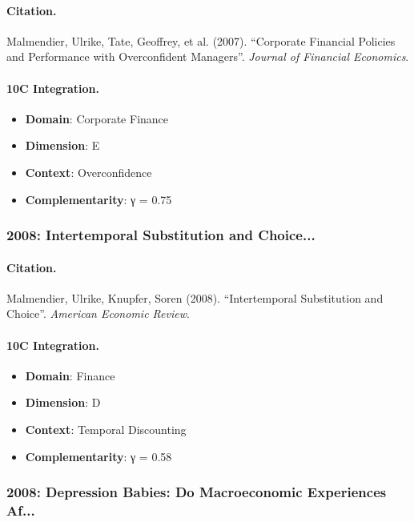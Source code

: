 \paragraph{Citation.}
Malmendier, Ulrike, Tate, Geoffrey, et al. (2007). ``Corporate Financial Policies and Performance with Overconfident Managers''. \textit{Journal of Financial Economics}.

\paragraph{10C Integration.}
\begin{itemize}[nosep]
  \item \textbf{Domain}: Corporate Finance
  \item \textbf{Dimension}: E
  \item \textbf{Context}: Overconfidence
  \item \textbf{Complementarity}: γ = 0.75
\end{itemize}


\subsubsection{2008: Intertemporal Substitution and Choice...}

\paragraph{Citation.}
Malmendier, Ulrike, Knupfer, Soren (2008). ``Intertemporal Substitution and Choice''. \textit{American Economic Review}.

\paragraph{10C Integration.}
\begin{itemize}[nosep]
  \item \textbf{Domain}: Finance
  \item \textbf{Dimension}: D
  \item \textbf{Context}: Temporal Discounting
  \item \textbf{Complementarity}: γ = 0.58
\end{itemize}


\subsubsection{2008: Depression Babies: Do Macroeconomic Experiences Af...}

